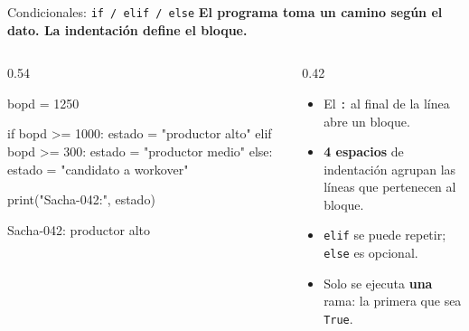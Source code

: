 \documentclass[aspectratio=169, 11pt]{beamer}
\begin{document}
\begin{frame}[fragile]{Condicionales: \texttt{if / elif / else}}
  \vspace{-6pt}
  {\small\color{arcaDark}\bfseries
    El programa toma un camino según el dato. La indentación define el bloque.}

  \vspace{4pt}
  \begin{columns}[T]
    \begin{column}{0.54\textwidth}
      \begin{pyblock}
bopd = 1250

if bopd >= 1000:
    estado = "productor alto"
elif bopd >= 300:
    estado = "productor medio"
else:
    estado = "candidato a workover"

print("Sacha-042:", estado)
      \end{pyblock}
      \vspace{-4pt}
      \begin{outputblock}
Sacha-042: productor alto
      \end{outputblock}
    \end{column}

    \begin{column}{0.42\textwidth}
      {\scriptsize\color{textMuted}
      \begin{itemize}\setlength{\itemsep}{4pt}
        \item[{\color{arcaRed}\scriptsize\faArrowRight}]
          El \texttt{:} al final de la línea
          abre un bloque.
        \item[{\color{arcaRed}\scriptsize\faArrowRight}]
          \textbf{4 espacios} de indentación
          agrupan las líneas que pertenecen
          al bloque.
        \item[{\color{arcaRed}\scriptsize\faArrowRight}]
          \texttt{elif} se puede repetir; \texttt{else}
          es opcional.
        \item[{\color{arcaRed}\scriptsize\faExclamationTriangle}]
          Solo se ejecuta \textbf{una} rama:
          la primera que sea \texttt{True}.
      \end{itemize}
      }
    \end{column}
  \end{columns}
\end{frame}
\end{document}
